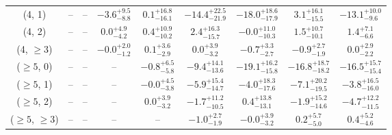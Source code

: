 \begin{table}[h!]
{\begin{tabular}{ccccccccc}
	(4, 1) & -- & -- & $-3.6^{+ 9.5 }_{- 8.8 }$ & $0.1^{+ 16.8 }_{- 16.1 }$ & $-14.4^{+ 22.5 }_{- 21.9 }$ & $-18.0^{+ 18.6 }_{- 17.9 }$ & $3.1^{+ 16.1 }_{- 15.5 }$ & $-13.1^{+ 10.0 }_{- 9.6 }$ \\[0.5ex] 
	(4, 2) & -- & -- & $0.0^{+ 4.9 }_{- 4.2 }$ & $0.4^{+ 10.9 }_{- 10.2 }$ & $2.4^{+ 16.3 }_{- 15.7 }$ & $-0.0^{+ 11.0 }_{- 10.3 }$ & $1.5^{+ 10.7 }_{- 10.1 }$ & $1.4^{+ 7.1 }_{- 6.6 }$ \\[0.5ex] 
	(4, $\ge3$) & -- & -- & $-0.0^{+ 2.0 }_{- 1.2 }$ & $0.1^{+ 3.6 }_{- 2.9 }$ & $0.0^{+ 3.9 }_{- 3.2 }$ & $-0.7^{+ 3.3 }_{- 2.7 }$ & $-0.9^{+ 2.7 }_{- 1.9 }$ & $0.0^{+ 2.9 }_{- 2.2 }$ \\[0.5ex] 
	($\ge5$, 0) & -- & -- & -- & $-0.8^{+ 6.5 }_{- 5.8 }$ & $-9.4^{+ 14.1 }_{- 13.6 }$ & $-19.1^{+ 16.2 }_{- 15.8 }$ & $-16.8^{+ 18.7 }_{- 18.2 }$ & $-16.5^{+ 15.7 }_{- 15.4 }$ \\[0.5ex] 
	($\ge5$, 1) & -- & -- & -- & $-0.0^{+ 4.5 }_{- 3.8 }$ & $-5.9^{+ 15.4 }_{- 14.7 }$ & $-4.0^{+ 18.3 }_{- 17.6 }$ & $-7.1^{+ 20.2 }_{- 19.5 }$ & $-3.8^{+ 16.5 }_{- 16.0 }$ \\[0.5ex] 
	($\ge5$, 2) & -- & -- & -- & $0.0^{+ 3.9 }_{- 3.2 }$ & $-1.7^{+ 11.2 }_{- 10.5 }$ & $0.4^{+ 13.8 }_{- 13.1 }$ & $-1.9^{+ 15.2 }_{- 14.6 }$ & $-4.7^{+ 12.2 }_{- 11.5 }$ \\[0.5ex] 
	($\ge5$, $\ge3$) & -- & -- & -- & -- & $-1.0^{+ 2.7 }_{- 1.9 }$ & $-0.0^{+ 3.9 }_{- 3.2 }$ & $0.2^{+ 5.7 }_{- 5.0 }$ & $0.4^{+ 5.2 }_{- 4.6 }$ \\[0.5ex] 
	\hline
	\hline
\end{tabular}}
\end{table}
